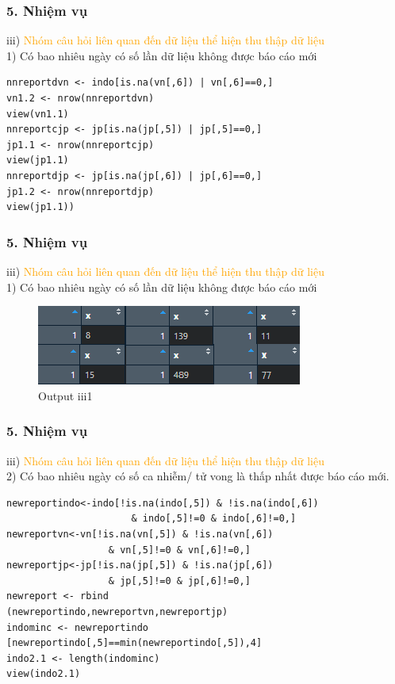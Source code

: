 \documentclass[english,10pt,table]{beamer}
\begin{document}
\begin{frame}[fragile]
\frametitle{5.  Nhiệm vụ}
	iii) \textcolor{orange}{Nhóm câu hỏi liên quan đến dữ liệu thể hiện thu thập dữ liệu}\\%
    1) Có bao nhiêu ngày có số lần dữ liệu không được báo cáo mới
 \begin{lstlisting}[frame=single]  
nnreportdvn <- indo[is.na(vn[,6]) | vn[,6]==0,]
vn1.2 <- nrow(nnreportdvn)
view(vn1.1)
nnreportcjp <- jp[is.na(jp[,5]) | jp[,5]==0,]
jp1.1 <- nrow(nnreportcjp)
view(jp1.1)
nnreportdjp <- jp[is.na(jp[,6]) | jp[,6]==0,]
jp1.2 <- nrow(nnreportdjp)
view(jp1.1))
	\end{lstlisting}
\end{frame}

\begin{frame}[fragile]
\frametitle{5.  Nhiệm vụ}
	iii) \textcolor{orange}{Nhóm câu hỏi liên quan đến dữ liệu thể hiện thu thập dữ liệu}\\%
    1) Có bao nhiêu ngày có số lần dữ liệu không được báo cáo mới
	\begin{figure}[h!]
	\begin{center}
		    \includegraphics[scale = 1]{Images/III/iii1.png}
		     \caption{Output iii1}
		\end{center}
		\end{figure}
\end{frame}

\begin{frame}[fragile]
\frametitle{5.  Nhiệm vụ}
	iii) \textcolor{orange}{Nhóm câu hỏi liên quan đến dữ liệu thể hiện thu thập dữ liệu}\\%
    2) Có bao nhiêu ngày có số ca nhiễm/ tử vong là thấp nhất được báo cáo mới.
    \begin{lstlisting}[frame=single]
newreportindo<-indo[!is.na(indo[,5]) & !is.na(indo[,6]) 
                      & indo[,5]!=0 & indo[,6]!=0,]
newreportvn<-vn[!is.na(vn[,5]) & !is.na(vn[,6]) 
                  & vn[,5]!=0 & vn[,6]!=0,]
newreportjp<-jp[!is.na(jp[,5]) & !is.na(jp[,6]) 
                  & jp[,5]!=0 & jp[,6]!=0,]
newreport <- rbind
(newreportindo,newreportvn,newreportjp)
indominc <- newreportindo
[newreportindo[,5]==min(newreportindo[,5]),4]
indo2.1 <- length(indominc)
view(indo2.1)
	\end{lstlisting}
\end{frame}
\end{document}
